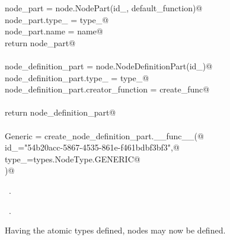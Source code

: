 \documentclass[
    a4paper,      %
    10pt,         %
    openright,    %
    notitlepage,  %
    parskip=half, %
]{scrreprt}       %
\theoremstyle{definition}                    %
\begin{document}
\begin{flushleft}
\begin{minipage}{\linewidth}
\begin{list}{}{}
\mbox{}\lstinline@            node_part = node.NodePart(id_, default_function)@\\
\mbox{}\lstinline@            node_part.type_ = type_@\\
\mbox{}\lstinline@            node_part.name = name@\\
\mbox{}\lstinline@            return node_part@\\
\mbox{}\lstinline@@\\
\mbox{}\lstinline@        node_definition_part = node.NodeDefinitionPart(id_)@\\
\mbox{}\lstinline@        node_definition_part.type_ = type_@\\
\mbox{}\lstinline@        node_definition_part.creator_function = create_func@\\
\mbox{}\lstinline@@\\
\mbox{}\lstinline@        return node_definition_part@\\
\mbox{}\lstinline@@\\
\mbox{}\lstinline@    Generic = create_node_definition_part.__func__(@\\
\mbox{}\lstinline@        id_="54b20acc-5867-4535-861e-f461bdbf3bf3",@\\
\mbox{}\lstinline@        type_=types.NodeType.GENERIC@\\
\mbox{}\lstinline@    )@\\
\mbox{}\lstinline@@{\NWsep}
\end{list}
\vspace{-1.5ex}
\footnotesize
\begin{list}{}{\setlength{\itemsep}{-\parsep}\setlength{\itemindent}{-\leftmargin}}
\item \NWtxtMacroDefBy\ .
\item \NWtxtMacroRefIn\ .

\item{}
\end{list}
\end{minipage}\vspace{4ex}
\end{flushleft}
Having the atomic types defined, nodes may now be defined.
\end{document}

